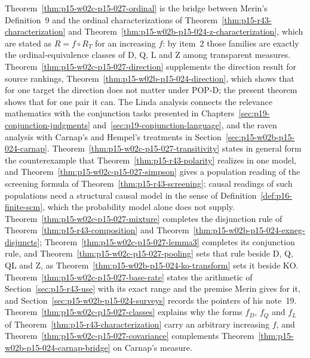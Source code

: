 Theorem~\ref{thm:p15-w02c-p15-027-ordinal} is the bridge between
Merin's Definition~9 and the ordinal characterizations of
Theorem~\ref{thm:p15-r43-characterization} and
Theorem~\ref{thm:p15-w02b-p15-024-z-characterization}, which are stated
as \(R=f\circ R_T\) for an increasing \(f\): by item~2 those families
are exactly the ordinal-equivalence classes of D, Q, L and Z among
transparent measures. Theorem~\ref{thm:p15-w02c-p15-027-direction}
supplements the direction result for source rankings,
Theorem~\ref{thm:p15-w02b-p15-024-direction}, which shows that for one
target the direction does not matter under POP-D; the present theorem
shows that for one pair it can. The Linda analysis connects the
relevance mathematics with the conjunction tasks presented in
Chapters~\ref{sec:p19-conjunction-judgments}
and~\ref{sec:p19-conjunction-language}, and the raven analysis with
Carnap's and Hempel's treatments in
Section~\ref{sec:p15-w02b-p15-024-carnap}.
Theorem~\ref{thm:p15-w02c-p15-027-transitivity} states in general form
the counterexample that Theorem~\ref{thm:p15-r43-polarity} realizes in one
model, and Theorem~\ref{thm:p15-w02c-p15-027-simpson} gives a population
reading of the screening formula of
Theorem~\ref{thm:p15-r43-screening}; causal readings of such populations
need a structural causal model in the sense of
Definition~\ref{def:p16-finite-scm}, which the probability model alone
does not supply.
Theorem~\ref{thm:p15-w02c-p15-027-mixture} completes the
disjunction rule of Theorem~\ref{thm:p15-r43-composition} and
Theorem~\ref{thm:p15-w02b-p15-024-exneg-disjuncts};
Theorem~\ref{thm:p15-w02c-p15-027-lemma3} completes its conjunction rule,
and Theorem~\ref{thm:p15-w02c-p15-027-pooling} sets that rule beside
D, Q, QL and Z, as Theorem~\ref{thm:p15-w02b-p15-024-ko-transform} sets it
beside KO.
Theorem~\ref{thm:p15-w02c-p15-027-base-rate} states the arithmetic
of Section~\ref{sec:p15-r43-use} with its exact range and the premise
Merin gives for it, and Section~\ref{sec:p15-w02b-p15-024-surveys}
records the pointers of his note~19.
Theorem~\ref{thm:p15-w02c-p15-027-classes} explains why the forms
\(f_D\), \(f_Q\) and \(f_L\) of
Theorem~\ref{thm:p15-r43-characterization} carry an arbitrary increasing
\(f\), and Theorem~\ref{thm:p15-w02c-p15-027-covariance} complements
Theorem~\ref{thm:p15-w02b-p15-024-carnap-bridge} on Carnap's measure.

